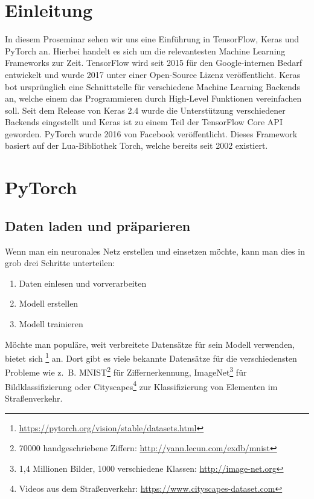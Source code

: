 \section{Einleitung}
In diesem Proseminar sehen wir uns eine Einführung in TensorFlow, Keras und PyTorch an. 
Hierbei handelt es sich um die relevantesten Machine Learning Frameworks zur Zeit. 
TensorFlow wird seit 2015 für den Google-internen Bedarf entwickelt und 
wurde 2017 unter einer Open-Source Lizenz veröffentlicht. 
Keras bot ursprünglich eine Schnittstelle für verschiedene Machine Learning Backends an, welche 
einem das Programmieren durch High-Level Funktionen vereinfachen soll. 
Seit dem Release von Keras 2.4 wurde die Unterstützung verschiedener 
Backends eingestellt und Keras ist zu einem Teil der TensorFlow Core API geworden. 
PyTorch wurde 2016 von Facebook veröffentlicht. Dieses Framework basiert auf 
der Lua-Bibliothek Torch, welche bereits seit 2002 existiert.

\section{PyTorch}
\subsection{Daten laden und präparieren}
Wenn man ein neuronales Netz erstellen und einsetzen möchte, kann man dies in grob 
drei Schritte unterteilen: 
\begin{enumerate}
    \item Daten einlesen und vorverarbeiten
    \item Modell erstellen
    \item Modell trainieren
\end{enumerate}

Möchte man populäre, weit verbreitete Datensätze für sein Modell verwenden, bietet sich 
\footnote{\url{https://pytorch.org/vision/stable/datasets.html}} 
an. Dort gibt es viele bekannte Datensätze für die verschiedensten Probleme 
wie z.~B. MNIST\footnote{70000 handgeschriebene Ziffern: \url{http://yann.lecun.com/exdb/mnist}} für Ziffernerkennung, 
ImageNet\footnote{1,4 Millionen Bilder, 1000 verschiedene Klassen: \url{http://image-net.org}} für Bildklassifizierung oder 
Cityscapes\footnote{Videos aus dem Straßenverkehr: \url{https://www.cityscapes-dataset.com}} 
zur Klassifizierung von Elementen im Straßenverkehr. 

